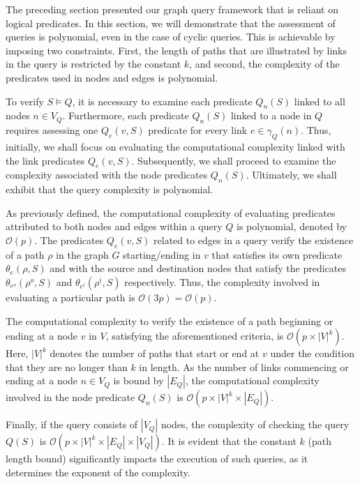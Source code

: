\documentclass[mathematics,article,submit,pdftex,moreauthors]{Definitions/mdpi}
\begin{document}
The preceding section presented our graph query framework that is reliant on logical predicates. In this section, we will demonstrate that the assessment of queries is polynomial, even in the case of cyclic queries. This is achievable by imposing two constraints. First, the length of paths that are illustrated by links in the query is restricted by the constant $k$, and second, the complexity of the predicates used in nodes and edges is polynomial.

To verify $S\models Q$, it is necessary to examine each predicate $Q_n(S)$ linked to all nodes $n \in V_Q$. Furthermore, each predicate $Q_n(S)$ linked to a node in $Q$ requires assessing one $Q_e(v,S)$ predicate for every link $e\in\gamma_Q(n)$. Thus, initially, we shall focus on evaluating the computational complexity linked with the link predicates $Q_e(v,S)$. Subsequently, we shall proceed to examine the complexity associated with the node predicates $Q_n(S)$. Ultimately, we shall exhibit that the query complexity is polynomial.

As previously defined, the computational complexity of evaluating predicates attributed to both nodes and edges within a query $Q$ is polynomial, denoted by $\mathcal{O}(p)$. The predicates $Q_e(v,S)$ related to edges in a query verify the existence of a path $\rho$ in the graph $G$ starting/ending in $v$ that satisfies its own predicate $\theta_e (\rho, S)$ and with the source and destination nodes that satisfy the predicates $\theta_{e^o} (\rho^o , S)$ and $\theta_{e^i} (\rho^i , S)$ respectively. Thus, the complexity involved in evaluating a particular path is $\mathcal{O}(3p) = \mathcal{O}(p)$. 

The computational complexity to verify the existence of a path beginning or ending at a node $v$ in $V$, satisfying the aforementioned criteria, is $\mathcal{O}(p \times |V|^k)$. Here, $|V|^k$ denotes the number of paths that start or end at $v$ under the condition that they are no longer than $k$ in length. As the number of links commencing or ending at a node $n \in V_Q$ is bound by $|E_Q|$, the computational complexity involved in the node predicate $Q_n(S)$ is $\mathcal{O}(p\times |V|^k \times |E_Q|)$. 

Finally, if the query consists of $|V_Q|$ nodes, the complexity of checking the query $Q(S)$ is $\mathcal{O}(p\times |V|^k \times |E_Q| \times |V_Q|)$. It is evident that the constant $k$ (path length bound) significantly impacts the execution of such queries, as it determines the exponent of the complexity.
\end{document}
